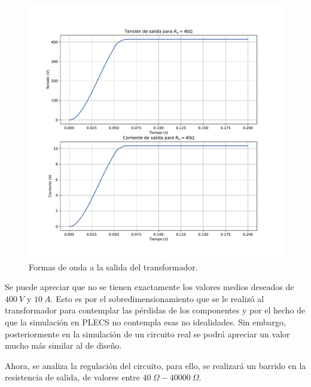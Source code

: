 \begin{figure}
	\centering
	\includegraphics[width=1\linewidth]{../salida_40}
	\caption{Formas de onda a la salida del transformador.}
	\label{fig:salida40}
\end{figure}

Se puede apreciar que no se tienen exactamente los valores medios deseados de $400 \ V$ y $10 \ A$. Esto es por el sobredimensionamiento que se le realizó al transformador para contemplar las pérdidas de los componentes y por el hecho de que la simulación en PLECS no contempla esas no idealidades. Sin embargo, posteriormente en la simulación de un circuito real se podrá apreciar un valor mucho más similar al de diseño.

Ahora, se analiza la regulación del circuito, para ello, se realizará un barrido en la resistencia de salida, de valores entre $40 \ \Omega - 40000 \ \Omega$.

